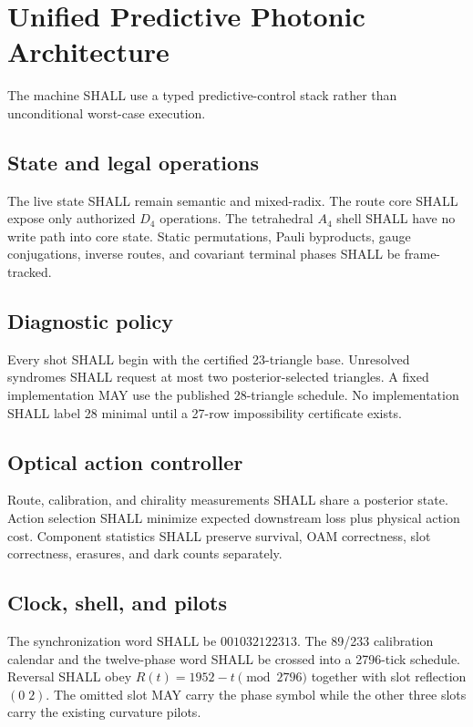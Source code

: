 \section{Unified Predictive Photonic Architecture}
\label{sec:bt3025-3031-overhaul}

The machine SHALL use a typed predictive-control stack rather than unconditional
worst-case execution.

\subsection{State and legal operations}
The live state SHALL remain semantic and mixed-radix.  The route core SHALL expose only
authorized \(D_4\) operations.  The tetrahedral \(A_4\) shell SHALL have no write path
into core state.  Static permutations, Pauli byproducts, gauge conjugations, inverse
routes, and covariant terminal phases SHALL be frame-tracked.

\subsection{Diagnostic policy}
Every shot SHALL begin with the certified 23-triangle base.  Unresolved syndromes SHALL
request at most two posterior-selected triangles.  A fixed implementation MAY use the
published 28-triangle schedule.  No implementation SHALL label 28 minimal until a
27-row impossibility certificate exists.

\subsection{Optical action controller}
Route, calibration, and chirality measurements SHALL share a posterior state.  Action
selection SHALL minimize expected downstream loss plus physical action cost.  Component
statistics SHALL preserve survival, OAM correctness, slot correctness, erasures, and dark
counts separately.

\subsection{Clock, shell, and pilots}
The synchronization word SHALL be \(001032122313\).  The 89/233 calibration calendar and
the twelve-phase word SHALL be crossed into a 2796-tick schedule.  Reversal SHALL obey
\(R(t)=1952-t\pmod{2796}\) together with slot reflection \((0\;2)\).  The omitted slot
MAY carry the phase symbol while the other three slots carry the existing curvature
pilots.

